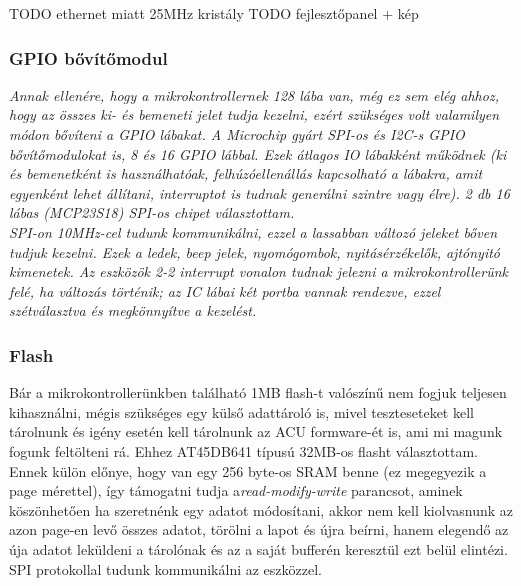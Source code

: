 \documentclass[a4paper, 12pt]{article}
\newcommand{\tab}{\hspace*{1em}}
\begin{document}
TODO ethernet miatt 25MHz kristály
TODO fejlesztőpanel + kép


\subsubsection{GPIO bővítőmodul}
\emph{
\tab Annak ellenére, hogy a mikrokontrollernek 128 lába van, még ez sem elég ahhoz, hogy az összes ki- és bemeneti jelet tudja kezelni, ezért szükséges volt valamilyen módon bővíteni a GPIO lábakat. A Microchip\textregistered{} gyárt SPI-os és I2C-s GPIO bővítőmodulokat is, 8 és 16 GPIO lábbal. Ezek átlagos IO lábakként működnek (ki és bemenetként is használhatóak, felhúzóellenállás kapcsolható a lábakra, amit egyenként lehet állítani, interruptot is tudnak generálni szintre vagy élre). 2 db 16 lábas (MCP23S18) \cite{mcp23s18} SPI-os chipet választottam.\\
SPI-on 10MHz-cel tudunk kommunikálni, ezzel a lassabban változó jeleket bőven tudjuk kezelni. Ezek a ledek, beep jelek, nyomógombok, nyitásérzékelők, ajtónyitó kimenetek. Az eszközök 2-2 interrupt vonalon tudnak jelezni a mikrokontrollerünk felé, ha változás történik; az IC lábai két portba vannak rendezve, ezzel szétválasztva és megkönnyítve a kezelést.}


\subsubsection{Flash}
\tab Bár a mikrokontrollerünkben található 1MB flash-t valószínű nem fogjuk teljesen kihasználni, mégis szükséges egy külső adattároló is, mivel teszteseteket kell tárolnunk és igény esetén kell tárolnunk az ACU formware-ét is, ami mi magunk fogunk feltölteni rá. Ehhez AT45DB641 \cite{flash} típusú 32MB-os flasht választottam. Ennek külön előnye, hogy van egy 256 byte-os SRAM benne (ez megegyezik a page mérettel), így támogatni tudja a\emph{read-modify-write} parancsot, aminek köszönhetően ha szeretnénk egy adatot módosítani, akkor nem kell kiolvasnunk az azon page-en levő összes adatot, törölni a lapot és újra beírni, hanem elegendő az úja adatot leküldeni a tárolónak és az a saját bufferén keresztül ezt belül elintézi. SPI protokollal tudunk kommunikálni az eszközzel.
\end{document}

